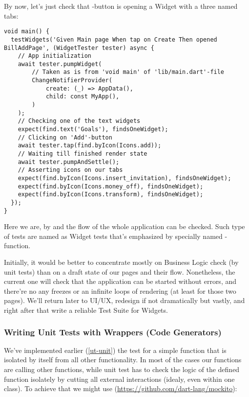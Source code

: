 \noindent By now, let's just check that -button is opening a Widget with a three named tabs:

\begin{lstlisting}
void main() {
  testWidgets('Given Main page When tap on Create Then opened BillAddPage', (WidgetTester tester) async {
    // App initialization
    await tester.pumpWidget(
        // Taken as is from 'void main' of 'lib/main.dart'-file
        ChangeNotifierProvider(
            create: (_) => AppData(),
            child: const MyApp(),
        )
    );
    // Checking one of the text widgets
    expect(find.text('Goals'), findsOneWidget);
    // Clicking on 'Add'-button
    await tester.tap(find.byIcon(Icons.add));
    // Waiting till finished render state
    await tester.pumpAndSettle();
    // Asserting icons on our tabs
    expect(find.byIcon(Icons.insert_invitation), findsOneWidget);
    expect(find.byIcon(Icons.money_off), findsOneWidget);
    expect(find.byIcon(Icons.transform), findsOneWidget);
  });
}
\end{lstlisting}

Here we are, by  and  the flow of the whole application can be checked. Such type of tests are named as 
Widget tests that's emphasized by specially named -function.

Initially, it would be better to concentrate mostly on Business Logic check (by unit tests) than on a draft state of 
our pages and their flow. Nonetheless, the current one will check that the application can be started without errors, 
and there're no any freezes or an infinite loops of rendering (at least for those two pages). We'll return later to 
UI/UX, redesign if not dramatically but vastly, and right after that write a reliable Test Suite for Widgets. 


\subsubsection{Writing Unit Tests with Wrappers (Code Generators)} \label{ut-code-generator}

We've implemented earlier (\ref{ut-unit}) the test for a simple function that is isolated by itself from all other functionality. 
In most of the cases our functions are calling other functions, while unit test has to check the logic of the defined 
function isolately by cutting all external interactions (idealy, even within one class). To achieve that we might
use  (\href{https://github.com/dart-lang/mockito}{https://github.com/dart-lang/mockito}):

